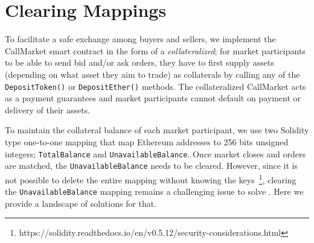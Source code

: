 \section{Clearing Mappings}

To facilitate a safe exchange among buyers and sellers, we implement the CallMarket smart contract in the form of a \textit{collateralized}; for market participants to be able to send bid and/or ask orders, they have to first supply assets (depending on what asset they aim to trade) as collaterals  by calling any of the  \texttt{DepositToken()} or \texttt{DepositEther()} methods. The collateralized CallMarket acts as a payment guarantees and market participants cannot default on payment or delivery of their assets.

To maintain the collateral balance of each market participant, we use two Solidity type one-to-one mapping that map Ethereum addresses to 256 bits unsigned integers; \texttt{TotalBalance} and \texttt{UnavailableBalance}. Once market closes and orders are matched, the \texttt{UnavailableBalance} needs to be cleared. However, since it is not possible to delete the entire mapping without knowing the keys~\footnote{https://solidity.readthedocs.io/en/v0.5.12/security-considerations.html}, clearing the \texttt{UnavailableBalance} mapping remains a challenging issue to solve . Here we provide a landscape of solutions for that.

